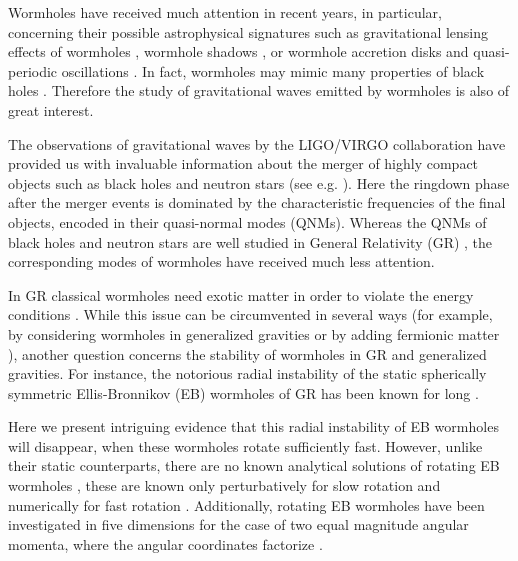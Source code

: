 \documentclass{article}
\begin{document}
Wormholes have received much attention in recent years, in particular, concerning their possible astrophysical signatures such as gravitational lensing effects of wormholes
\cite{Cramer:1994qj,Safonova:2001vz,Perlick:2003vg,Nandi:2006ds,Abe:2010ap,Toki:2011zu,Nakajima:2012pu,Tsukamoto:2012xs,Kuhfittig:2013hva,Bambi:2013nla,Takahashi:2013jqa,Tsukamoto:2016zdu},
wormhole shadows
\cite{Bambi:2013nla,Nedkova:2013msa,Ohgami:2015nra,Shaikh:2018kfv,Gyulchev:2018fmd,Guerrero:2022qkh},
or wormhole accretion disks and quasi-periodic oscillations
\cite{Harko:2008vy,Harko:2009xf,Bambi:2013jda,Zhou:2016koy,Lamy:2018zvj,Deligianni:2021ecz,Deligianni:2021hwt}.
In fact, wormholes may mimic many properties of black holes 
\cite{Damour:2007ap,Bambi:2013nla,Azreg-Ainou:2014dwa,Dzhunushaliev:2016ylj,Cardoso:2016rao,Konoplya:2016hmd,Nandi:2016uzg,Bueno:2017hyj,Blazquez-Salcedo:2018ipc,Azad:2020ajs,Azad:2022qqn}.
Therefore the study of gravitational waves emitted by wormholes is also of great interest.

The observations of gravitational waves by the LIGO/VIRGO collaboration have provided us with invaluable information about the merger of highly compact objects such as black holes and neutron stars (see e.g. \cite{LIGOScientific:2016aoc,LIGOScientific:2017vwq}). 
Here the ringdown phase after the merger events is dominated by the characteristic frequencies of the final objects, encoded in their quasi-normal modes (QNMs).
Whereas the QNMs of black holes and neutron stars are well studied in General Relativity (GR) \cite{Kokkotas:1999bd,Berti:2009kk,Konoplya:2011qq}, the corresponding modes of wormholes have received much less attention. %

In GR classical wormholes need exotic matter in order to violate the energy conditions \cite{Ellis:1973yv,Ellis:1979bh,Bronnikov:1973fh,Morris:1988tu,Morris:1988cz,Visser:1995cc,Hochberg:1996ee,Hochberg:1998ii,Visser:2003yf,Bronnikov:2005gm,Alcubierre:2017pqm}.
%
While this issue can be circumvented in several ways (for example, by considering wormholes in generalized gravities \cite{Kanti:2011jz,Alcubierre:2017pqm} or by adding fermionic matter \cite{Blazquez-Salcedo:2020czn,Konoplya:2021hsm}),
%
another question concerns the stability of wormholes in GR and generalized gravities. 
For instance, the notorious radial instability of the static spherically symmetric Ellis-Bronnikov (EB) wormholes of GR has been known for long \cite{Shinkai:2002gv,Gonzalez:2008wd,Gonzalez:2008xk,Cremona:2018wkj,Blazquez-Salcedo:2018ipc}.


Here we present intriguing evidence that this radial instability of EB wormholes will disappear, when these wormholes rotate sufficiently fast.
However, unlike their static counterparts, there are no known analytical solutions of rotating EB wormholes \cite{Volkov:2021blw}, these are known only perturbatively for slow rotation \cite{Kashargin:2007mm,Kashargin:2008pk} and numerically for fast rotation \cite{Kleihaus:2014dla,Chew:2016epf}.
Additionally, rotating EB wormholes have been investigated in five dimensions for the case of two equal magnitude angular momenta, where the angular coordinates factorize \cite{Dzhunushaliev:2013jja}.
\end{document}
